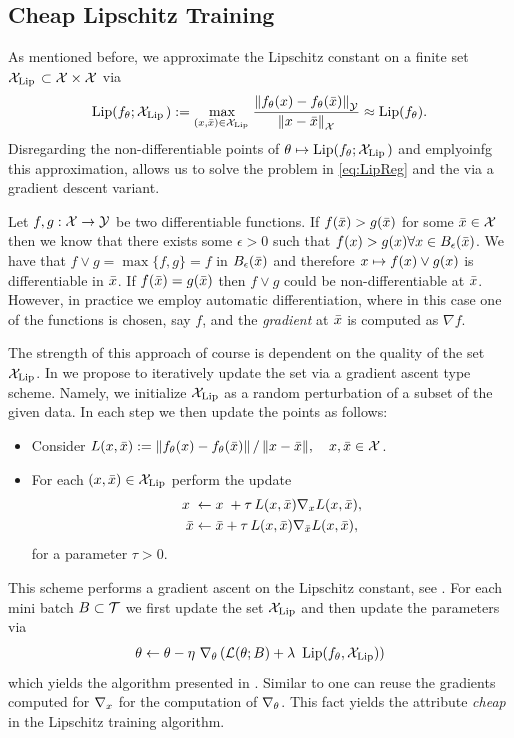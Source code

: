 \subsection{Cheap Lipschitz Training}
As mentioned before, we approximate the Lipschitz constant on a finite set $\mathcal{X}_{\operatorname{Lip}{}}\subset\mathcal{X}\times\mathcal{X}$ via
%
\begin{align*}
\operatorname{Lip}(f_\theta; \mathcal{X}_{\operatorname{Lip}{}}) := 
\max_{(x,\bar{x})\in\mathcal{X}_{\operatorname{Lip}{}}} \frac{\left\|f_\theta(x)-f_\theta(\bar{x})\right\|_{\mathcal{\mathcal{Y}}}}{\left\|x-\bar{x}\right\|_{\mathcal{X}}}
\approx
\operatorname{Lip}(f_\theta).
\end{align*}
%
%
Disregarding the non-differentiable points of $\theta\mapsto \operatorname{Lip}(f_\theta; \mathcal{X}_{\operatorname{Lip}{}})$ and emplyoinfg this approximation, allows us to solve the problem in \cref{eq:LipReg} and the via a gradient descent variant.
%
\begin{remark}{}{}
Let $f,g:\mathcal{X}\to\mathcal{\mathcal{Y}}$ be two differentiable functions. If $f(\bar{x})>g(\bar{x})$ for some $\bar{x}\in\mathcal{X}$ then we know that there exists some $\epsilon>0$ such that $f(x)>g(x)\forall x\in B_\epsilon(\bar{x})$. We have that $f\vee g = \max\{f,g\} = f$ in $B_\epsilon(\bar{x})$ and therefore $x\mapsto f(x)\vee g(x)$ is differentiable in $\bar{x}$. If $f(\bar{x})=g(\bar{x})$ then $f\vee g$ could be non-differentiable at $\bar{x}$. However, in practice we employ automatic differentiation, where in this case one of the functions is chosen, say $f$, and the \emph{gradient} at $\bar{x}$ is computed as $\nabla f$. 
\end{remark}
%
%
\noindent%
The strength of this approach of course is dependent on the quality of the set $\mathcal{X}_{\operatorname{Lip}}$. In \cite{bungert2021clip} we propose to iteratively update the set via a gradient ascent type scheme. Namely, we initialize $\mathcal{X}_{\operatorname{Lip}}$ as a random perturbation of a subset of the given data. In each step we then update the points as follows:
\begin{itemize}
\item Consider $L(x,\bar{x}) := {\left\|f_\theta(x)-f_\theta(\bar{x})\right\|}\,/\,{\left\|x-\bar{x}\right\|},\quad x,\bar{x}\in\mathcal{X}$.
\item For each $(x,\bar{x})\in\mathcal{X}_{\operatorname{Lip}}$ perform the update 
%
\begin{align*}
x\phantom{'} &\gets x\phantom{'} + \tau\,L(x,\bar{x}) \nabla_{x} L(x,\bar{x}),\\
\bar{x} &\gets \bar{x} + \tau\,L(x,\bar{x}) \nabla_{\bar{x}} L(x,\bar{x}),
\end{align*}
%
for a parameter $\tau>0$.
\end{itemize}
%
This scheme performs a gradient ascent on the Lipschitz constant, see \cite[Alg. 1]{bungert2021clip}. For each mini batch $B\subset\mathcal{T}$ we first update the set $\mathcal{X}_{\operatorname{Lip}}$ and then update the parameters via
%
\begin{align*}
\theta \gets \theta - \eta\ \nabla_\theta\left(\mathcal{L}(\theta; B) + 
\lambda~\operatorname{Lip}(f_\theta,\mathcal{X}_{\operatorname{Lip}})\right)
\end{align*}
%
which yields the algorithm presented in \cite[Alg. 2]{bungert2021clip}. Similar to \cite{shafahi2019adversarial} one can reuse the gradients computed for $\nabla_x$ for the computation of $\nabla_\theta$. This fact yields the attribute \emph{cheap} in the Lipschitz training algorithm.
%
